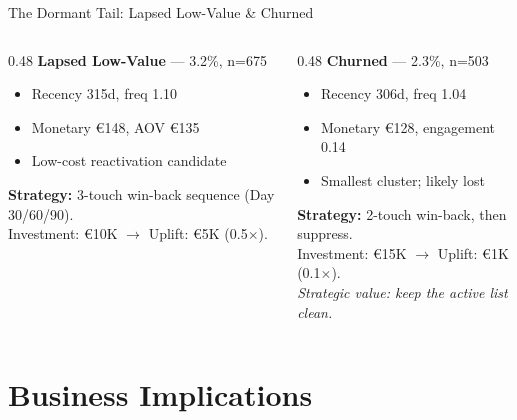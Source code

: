 \documentclass[aspectratio=169,10pt]{beamer}
\begin{document}
\begin{frame}{The Dormant Tail: Lapsed Low-Value \& Churned}
\begin{columns}[T]
  \begin{column}{0.48\textwidth}
    \textbf{\color{accent}Lapsed Low-Value} --- 3.2\%, n=675
    \begin{itemize}\small
      \item Recency 315d, freq 1.10
      \item Monetary \euro148, AOV \euro135
      \item Low-cost reactivation candidate
    \end{itemize}
    \textbf{Strategy:} 3-touch win-back sequence (Day 30/60/90).\\
    Investment: \euro10K $\rightarrow$ Uplift: \euro5K (0.5$\times$).
  \end{column}
  \begin{column}{0.48\textwidth}
    \textbf{\color{accent}Churned} --- 2.3\%, n=503
    \begin{itemize}\small
      \item Recency 306d, freq 1.04
      \item Monetary \euro128, engagement 0.14
      \item Smallest cluster; likely lost
    \end{itemize}
    \textbf{Strategy:} 2-touch win-back, then suppress.\\
    Investment: \euro15K $\rightarrow$ Uplift: \euro1K (0.1$\times$).\\[2pt]
    \small\textit{Strategic value: keep the active list clean.}
  \end{column}
\end{columns}
\end{frame}

\section{Business Implications}
\end{document}
